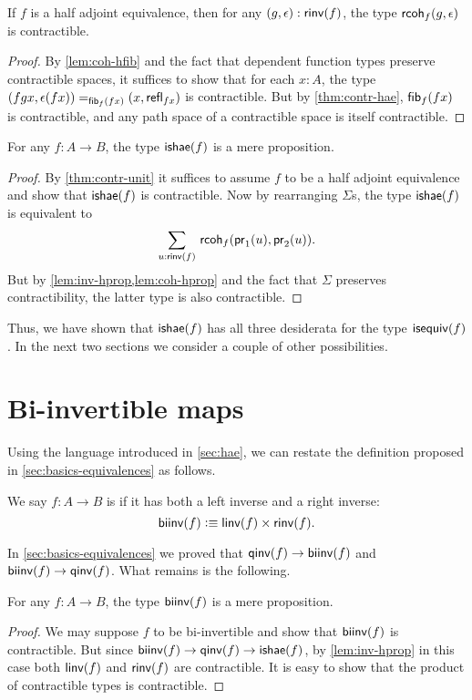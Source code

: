 \begin{lem}\label{lem:coh-hprop}
  If $f$ is a half adjoint equivalence, then for any $(g,\epsilon) : \rinv(f)$, the type $\rcoh{f}{g}{\epsilon}$ is contractible.
\end{lem}
\begin{proof}
  By \autoref{lem:coh-hfib} and the fact that dependent function types preserve contractible spaces, it suffices to show that for each $x:A$, the type $\id[\hfib{f}{fx}]{(fgx,\epsilon(fx))}{(x,\refl{fx})}$ is contractible.
  But by \autoref{thm:contr-hae}, $\hfib{f}{fx}$ is contractible, and any path space of a contractible space is itself contractible.
\end{proof}

\begin{thm}\label{thm:hae-hprop}
  For any $f : A \to B$, the type $\ishae(f)$ is a mere proposition.
\end{thm}
\begin{proof}
  By \autoref{thm:contr-unit} it suffices to assume $f$ to be a half adjoint equivalence and show that $\ishae(f)$ is contractible.
  Now by rearranging $\Sigma$s, the type $\ishae(f)$ is equivalent to
  \[\sm{u : \rinv(f)} \rcoh{f}{\proj{1}(u)}{\proj{2}(u)}.\]
  But by \cref{lem:inv-hprop,lem:coh-hprop} and the fact that $\Sigma$ preserves contractibility, the latter type is also contractible.
\end{proof}

Thus, we have shown that $\ishae(f)$ has all three desiderata for the type $\isequiv(f)$.
In the next two sections we consider a couple of other possibilities.


\section{Bi-invertible maps}
\label{sec:biinv}

Using the language introduced in \autoref{sec:hae}, we can restate the definition proposed in \autoref{sec:basics-equivalences} as follows.

\begin{defn}
  We say $f:A\to B$ is  if it has both a left inverse and a right inverse:
  \[ \biinv (f) \defeq \linv(f) \times \rinv(f). \]
\end{defn}

In \autoref{sec:basics-equivalences} we proved that $\qinv(f)\to\biinv(f)$ and $\biinv(f)\to\qinv(f)$.
What remains is the following.

\begin{thm}\label{thm:isprop-biinv}
  For any $f:A\to B$, the type $\biinv(f)$ is a mere proposition.
\end{thm}
\begin{proof}
  We may suppose $f$ to be bi-invertible and show that $\biinv(f)$ is contractible.
  But since $\biinv(f)\to\qinv(f) \to \ishae(f)$, by \autoref{lem:inv-hprop} in this case both $\linv(f)$ and $\rinv(f)$ are contractible.
  It is easy to show that the product of contractible types is contractible.
\end{proof}

